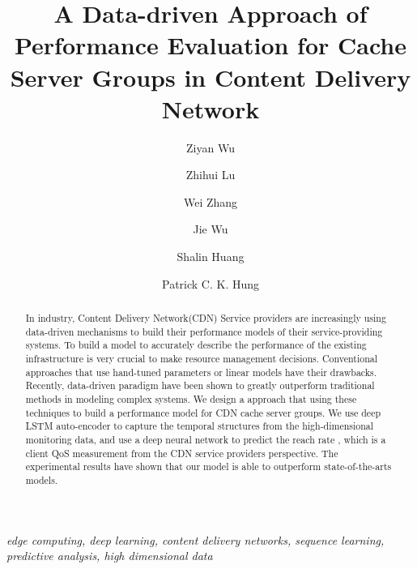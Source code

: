 \documentclass[5p]{elsarticle}
\newcommand{\dabiaolv}{reach rate }
\begin{document}
\begin{frontmatter}

\title{A Data-driven Approach of Performance Evaluation for Cache Server Groups in Content Delivery Network
    }

\author[mymainaddress]{Ziyan Wu
    }

\author[mymainaddress]{Zhihui Lu}

\author[mymainaddress]{Wei Zhang
    }
\author[mymainaddress]{Jie Wu
    }
\author[hismainaddress]{Shalin Huang}
\author[hisaddress]{Patrick C. K. Hung}


\address[mymainaddress]{School of Computer Science, Fudan University, Shanghai 200433, China}
\address[hismainaddress]{Wangsu Science & Technology Co., Ltd., Shanghai}
\address[hisaddress]{Faculty of Business and IT，University of Ontario Institute of Technology, Canada}


\begin{abstract}
In industry, Content Delivery Network(CDN) Service providers are increasingly using data-driven mechanisms to build their performance models of their service-providing systems. To build a model to accurately describe the performance of the existing infrastructure is very crucial to make resource management decisions. Conventional approaches that use hand-tuned parameters or linear models have their drawbacks. Recently, data-driven paradigm have been shown to greatly outperform traditional methods in modeling complex systems. We design a approach that using these techniques to build a performance model for CDN cache server groups. We use deep LSTM auto-encoder to capture the temporal structures from the high-dimensional monitoring data, and use a deep neural network to predict the \dabiaolv, which is a client QoS measurement from the CDN service providers perspective. The experimental results have shown that our model is able to outperform state-of-the-arts models.
\end{abstract}
\begin{keyword}
\textit{edge computing, deep learning, content delivery networks, sequence learning, predictive analysis, high dimensional data}
\end{keyword}
\end{frontmatter}
\linenumbers
\end{document}
